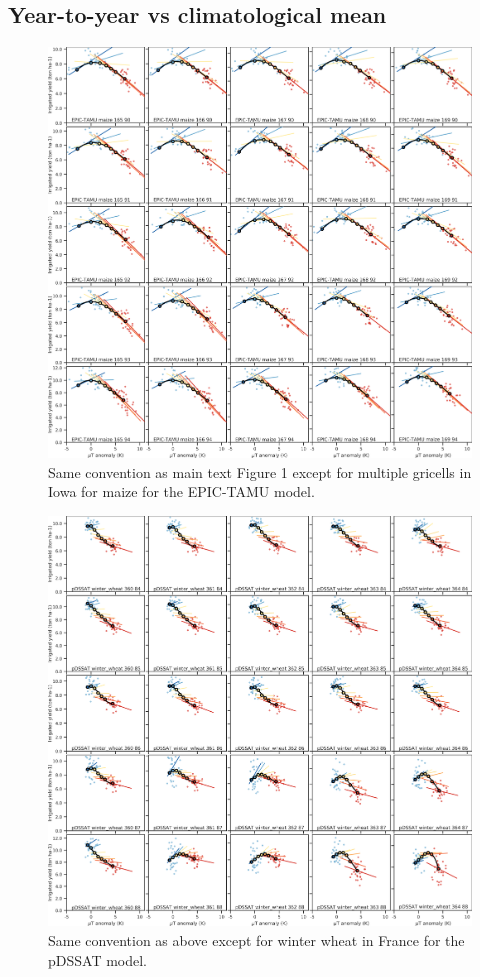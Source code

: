 \documentclass[10pt]{article}
\begin{document}
\clearpage
\subsection{Year-to-year vs climatological mean}
\begin{figure}[h!]
\centering
\includegraphics[width=\textwidth]{tempyearvclim_maize_EPIC-TAMU.png}
\caption{Same convention as main text Figure 1 except for multiple gricells in Iowa for maize for the EPIC-TAMU model.}
\label{fig:epicmaize}
\end{figure}

\begin{figure}[h!]
\centering
\includegraphics[width=\textwidth]{tempyearvclim_winter_wheat_pDSSAT.png}
\caption{Same convention as above except for winter wheat in France for the pDSSAT model.}
\label{fig:pdssatwwh}
\end{figure}
\end{document}

